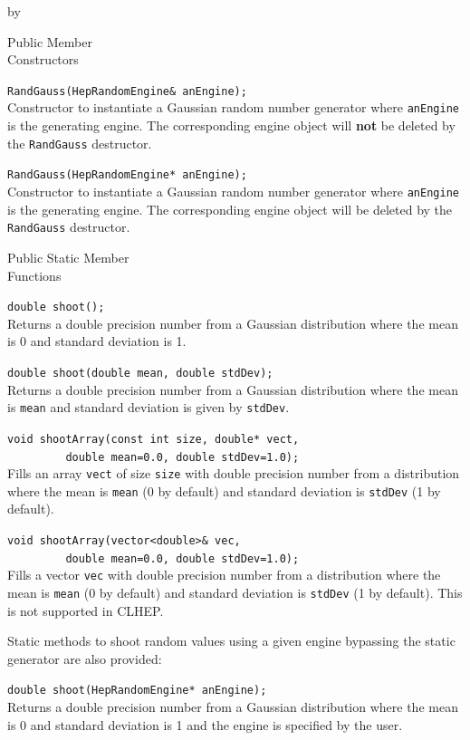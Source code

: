 \documentclass[twoside]{article}
\newcommand{\comp}[1]{\texttt{#1}}%
\newcommand{\entrylabel}[1]{\mbox{\textbf{{#1}}}\hfil}%
\newenvironment{entry}
{\begin{list}{}%
    {\renewcommand{\makelabel}{\entrylabel}%
     \setlength{\labelwidth}{90pt}%
     \setlength{\leftmargin}{\labelwidth}
     \advance\leftmargin by \labelsep%
      }%
    }%
  {\end{list}}
\newcommand{\Entrylabel}[1]%
{\raisebox{0pt}[1ex][0pt]{\makebox[\labelwidth][l]%
    {\parbox[t]{\labelwidth}{\hspace{0pt}\textbf{{#1}}}}}}
\newenvironment{Entry}%
{\renewcommand{\entrylabel}{\Entrylabel}\begin{entry}}%
  {\end{entry}}
\begin{document}
\begin{description}
\begin{Entry}
\item[Public Member\\ Constructors]

   \verb+RandGauss(HepRandomEngine& anEngine);+\\
   Constructor to instantiate a Gaussian random number generator
   where \comp{anEngine} is the generating engine.  The corresponding
   engine object will {\bf not} be deleted by the \comp{RandGauss} destructor.
   
   \verb+RandGauss(HepRandomEngine* anEngine);+\\
   Constructor to instantiate a Gaussian random number generator
   where \comp{anEngine} is the generating engine.  The corresponding
   engine object will be deleted by the \comp{RandGauss} destructor.
  
\item[Public Static Member\\ Functions]
  
   \verb+double shoot();+\\
   Returns a double precision number from a Gaussian distribution where the
   mean is 0 and standard deviation is 1.
  
   \verb+double shoot(double mean, double stdDev);+\\
   Returns a double precision number from a Gaussian distribution where the
   mean is \comp{mean} and standard deviation is given by
   \comp{stdDev}.

  \verb+void shootArray(const int size, double* vect,+\\
  \verb+         double mean=0.0, double stdDev=1.0);+\\
  Fills an array \comp{vect} of size \comp{size} with double
  precision number from a distribution where the
  mean is \comp{mean} (0 by default) and standard
  deviation is \comp{stdDev} (1 by default).

  \verb+void shootArray(vector<double>& vec,+\\
  \verb+         double mean=0.0, double stdDev=1.0);+\\
  Fills a vector \comp{vec} with double
  precision number from a distribution where the
  mean is \comp{mean} (0 by default) and standard
  deviation is \comp{stdDev} (1 by default).  This is not
  supported in CLHEP.
  
  Static methods to shoot random values using a given engine
  bypassing the static generator are also provided:

  \verb+double shoot(HepRandomEngine* anEngine);+\\
  Returns a double precision number from a Gaussian distribution where the
  mean is 0 and standard deviation is 1
  and the engine is specified by the user.
  

\end{Entry}
\end{description}
\end{document}
